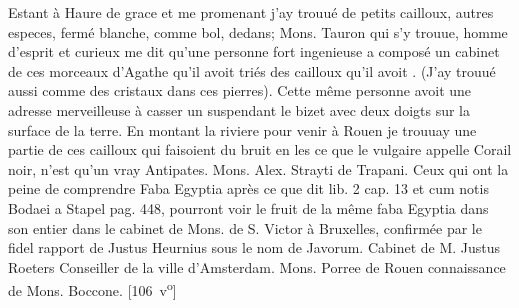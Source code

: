 Estant \`{a} Haure\protect{} de grace et me promenant j'ay trouu\'{e} de petits cailloux,  autres especes, ferm\'{e} blanche, comme bol, dedans; Mons. Tauron qui s'y trouue, homme d'esprit et curieux me dit qu'une personne fort ingenieuse a compos\'{e} un cabinet de ces morceaux d'Agathe\protect{} qu'il avoit tri\'{e}s des cailloux qu'il avoit .
(J'ay trouu\'{e} aussi comme des cristaux dans ces pierres).
Cette m\^{e}me personne avoit une adresse merveilleuse \`{a} casser un
suspendant le bizet avec deux doigts sur la surface de la terre. En montant la riviere pour venir \`{a} Rouen\protect{} je trouuay une partie de ces cailloux qui faisoient du bruit en les  ce que le vulgaire appelle Corail noir\protect{}, n'est qu'un vray Antipates.
\pend%
%
\pstart%
Mons. Alex. Strayti\protect{} de Trapani.\protect{}
\pend%
\pstart%
Ceux qui ont la peine de comprendre Faba Egyptia  après ce que dit \protect{}
 lib. 2 cap. 13
et \protect{} cum notis Bodaei a Stapel\protect{} pag. 448,
pourront voir le fruit de la m\^{e}me faba Egyptia dans son entier dans le cabinet de Mons. de S. Victor \`{a} Bruxelles\protect{}, confirm\'{e}e par le fidel rapport de Justus Heurnius\protect{} sous le nom de
Javorum.
\pend
\pstart
Cabinet de M. Justus Roeters\protect{} Conseiller de la ville d'Amsterdam.\protect{}
\pend%
\pstart%
Mons. Porree  de Rouen \protect{}  connaissance de Mons. Boccone.\protect{}
[106~v\textsuperscript{o}]%
\pend%
\count{}
\count{}
\count{}

